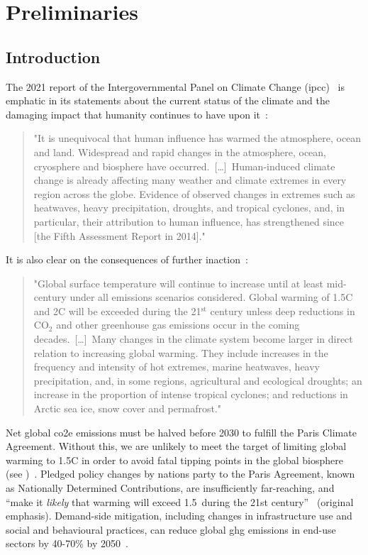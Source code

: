 \documentclass[../SustainableHEP.tex]{subfiles}
\begin{document}
\section{Preliminaries}
\label{sec:Introduction}

\subsection{Introduction}

The 2021 report of the Intergovernmental Panel on Climate Change (\acrshort{ipcc})~\cite{IPCC2021report} is emphatic in its statements about the current status of the climate and the damaging impact that humanity continues to have upon it~\cite{IPCC2021reportSPM}:
\begin{quotation}
"It is unequivocal that human influence has warmed the atmosphere, ocean and land. Widespread and rapid changes in the atmosphere, ocean, cryosphere and biosphere have occurred.\ [\dots]\ Human-induced climate change is already affecting many weather and climate extremes in every region 
across the globe. Evidence of observed changes in extremes such as heatwaves, heavy precipitation, droughts, 
and tropical cyclones, and, in particular, their attribution to human influence, has strengthened since [the Fifth Assessment Report in 2014]."
\end{quotation}
It is also clear on the consequences of further inaction~\cite{IPCC2021reportSPM}:
\begin{quotation}
"Global surface temperature will continue to increase until at least mid-century under all emissions scenarios
considered. Global warming of 1.5\degree C and 2\degree C will be exceeded during the 21$^\text{st}$ century unless deep reductions 
in $\mathrm{CO_2}$ and other greenhouse gas emissions occur in the coming decades.\ [\dots]\ Many changes in the climate system become larger in direct relation to increasing global warming. They 
include increases in the frequency and intensity of hot extremes, marine heatwaves, heavy precipitation, 
and, in some regions, agricultural and ecological droughts; an increase in the proportion of intense tropical 
cyclones; and reductions in Arctic sea ice, snow cover and permafrost."
\end{quotation}

Net global \acrshort{co2e} emissions must be halved before 2030 to fulfill the Paris Climate Agreement. Without this, we are unlikely to meet the  target of limiting global warming to 1.5\degree C in order to avoid fatal tipping points in the global biosphere (see )~\cite{IPCC19policy}. Pledged policy changes by nations party to the Paris Agreement, known as Nationally Determined Contributions, are insufficiently far-reaching, and ``make it {\it likely} that warming will exceed 1.5\degree\ during the 21st century''~\cite{IPCC2023SynthesisSPM} (original emphasis).  Demand-side mitigation, including changes in infrastructure use and social and behavioural practices, can reduce global \acrshort{ghg} emissions in end-use sectors by 40-70\% by 
2050~\cite{IPCC2022reportSPM}.
\end{document}
